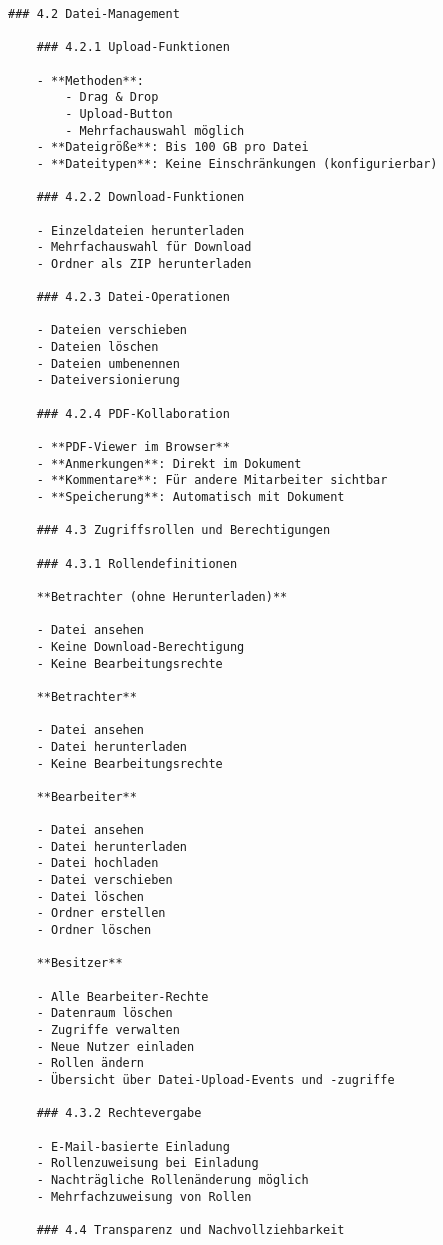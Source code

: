 \begin{Verbatim}[breaklines=true]
    ### 4.2 Datei-Management
    
    ### 4.2.1 Upload-Funktionen
    
    - **Methoden**:
        - Drag & Drop
        - Upload-Button
        - Mehrfachauswahl möglich
    - **Dateigröße**: Bis 100 GB pro Datei
    - **Dateitypen**: Keine Einschränkungen (konfigurierbar)
    
    ### 4.2.2 Download-Funktionen
    
    - Einzeldateien herunterladen
    - Mehrfachauswahl für Download
    - Ordner als ZIP herunterladen
    
    ### 4.2.3 Datei-Operationen
    
    - Dateien verschieben
    - Dateien löschen
    - Dateien umbenennen
    - Dateiversionierung
    
    ### 4.2.4 PDF-Kollaboration
    
    - **PDF-Viewer im Browser**
    - **Anmerkungen**: Direkt im Dokument
    - **Kommentare**: Für andere Mitarbeiter sichtbar
    - **Speicherung**: Automatisch mit Dokument
    
    ### 4.3 Zugriffsrollen und Berechtigungen
    
    ### 4.3.1 Rollendefinitionen
    
    **Betrachter (ohne Herunterladen)**
    
    - Datei ansehen
    - Keine Download-Berechtigung
    - Keine Bearbeitungsrechte
    
    **Betrachter**
    
    - Datei ansehen
    - Datei herunterladen
    - Keine Bearbeitungsrechte
    
    **Bearbeiter**
    
    - Datei ansehen
    - Datei herunterladen
    - Datei hochladen
    - Datei verschieben
    - Datei löschen
    - Ordner erstellen
    - Ordner löschen
    
    **Besitzer**
    
    - Alle Bearbeiter-Rechte
    - Datenraum löschen
    - Zugriffe verwalten
    - Neue Nutzer einladen
    - Rollen ändern
    - Übersicht über Datei-Upload-Events und -zugriffe
    
    ### 4.3.2 Rechtevergabe
    
    - E-Mail-basierte Einladung
    - Rollenzuweisung bei Einladung
    - Nachträgliche Rollenänderung möglich
    - Mehrfachzuweisung von Rollen
    
    ### 4.4 Transparenz und Nachvollziehbarkeit
    

\end{Verbatim}
